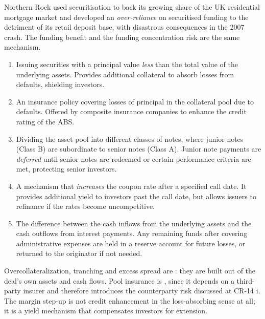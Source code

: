 \begin{crtrapbox}
Northern Rock used securitisation to back its growing share of the UK residential
mortgage market and developed an \emph{over-reliance} on securitised funding to
the detriment of its retail deposit base, with disastrous consequences in the 2007
crash. The funding benefit and the funding concentration risk are the same
mechanism.
\end{crtrapbox}


\begin{enumerate}
\item {} Issuing securities with a principal value
\emph{less} than the total value of the underlying assets. Provides additional
collateral to absorb losses from defaults, shielding investors.
\item {} An insurance policy covering losses of principal in
the collateral pool due to defaults. Offered by composite insurance companies to
enhance the credit rating of the ABS.
\item {} Dividing the asset pool into
different classes of notes, where junior notes (Class B) are subordinate to senior
notes (Class A). Junior note payments are \emph{deferred} until senior notes are
redeemed or certain performance criteria are met, protecting senior investors.
\item {} A mechanism that \emph{increases} the coupon rate
after a specified call date. It provides additional yield to investors past the
call date, but allows issuers to refinance if the rates become uncompetitive.
\item {} The difference between the cash inflows from the
underlying assets and the cash outflows from interest payments. Any remaining
funds after covering administrative expenses are held in a reserve account for
future losses, or returned to the originator if not needed.
\end{enumerate}

\begin{crkeybox}
Overcollateralization, tranching and excess spread are : they are
built out of the deal's own assets and cash flows. Pool insurance is
, since it depends on a third-party insurer and therefore
introduces the counterparty risk discussed at CR-14 i. The margin step-up is not
credit enhancement in the loss-absorbing sense at all; it is a yield mechanism
that compensates investors for extension.
\end{crkeybox}

